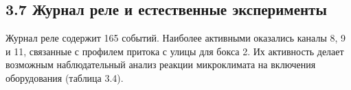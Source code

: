 \documentclass[a4paper,14pt]{extarticle}
\begin{document}
\hypertarget{ux436ux443ux440ux43dux430ux43b-ux440ux435ux43bux435-ux438-ux435ux441ux442ux435ux441ux442ux432ux435ux43dux43dux44bux435-ux44dux43aux441ux43fux435ux440ux438ux43cux435ux43dux442ux44b}{%
\subsection{3.7 Журнал реле и естественные
эксперименты}\label{ux436ux443ux440ux43dux430ux43b-ux440ux435ux43bux435-ux438-ux435ux441ux442ux435ux441ux442ux432ux435ux43dux43dux44bux435-ux44dux43aux441ux43fux435ux440ux438ux43cux435ux43dux442ux44b}}

Журнал реле содержит 165 событий. Наиболее активными оказались каналы 8,
9 и 11, связанные с профилем притока с улицы для бокса 2. Их активность
делает возможным наблюдательный анализ реакции микроклимата на включения
оборудования (таблица 3.4).
\end{document}
